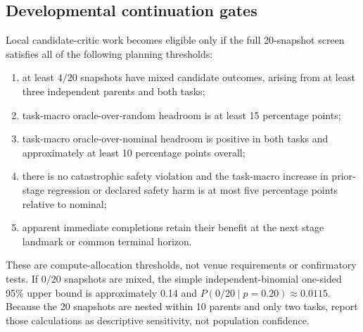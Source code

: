 \subsection{Developmental continuation gates}

Local candidate-critic work becomes eligible only if the full 20-snapshot screen satisfies all of the following planning thresholds:
\begin{enumerate}
  \item at least $4/20$ snapshots have mixed candidate outcomes, arising from at least three independent parents and both tasks;
  \item task-macro oracle-over-random headroom is at least 15 percentage points;
  \item task-macro oracle-over-nominal headroom is positive in both tasks and approximately at least 10 percentage points overall;
  \item there is no catastrophic safety violation and the task-macro increase in prior-stage regression or declared safety harm is at most five percentage points relative to nominal;
  \item apparent immediate completions retain their benefit at the next stage landmark or common terminal horizon.
\end{enumerate}

These are compute-allocation thresholds, not venue requirements or confirmatory tests. If $0/20$ snapshots are mixed, the simple independent-binomial one-sided 95\% upper bound is approximately 0.14 and $P(0/20\mid p=0.20)\approx0.0115$. Because the 20 snapshots are nested within 10 parents and only two tasks, report those calculations as descriptive sensitivity, not population confidence.


